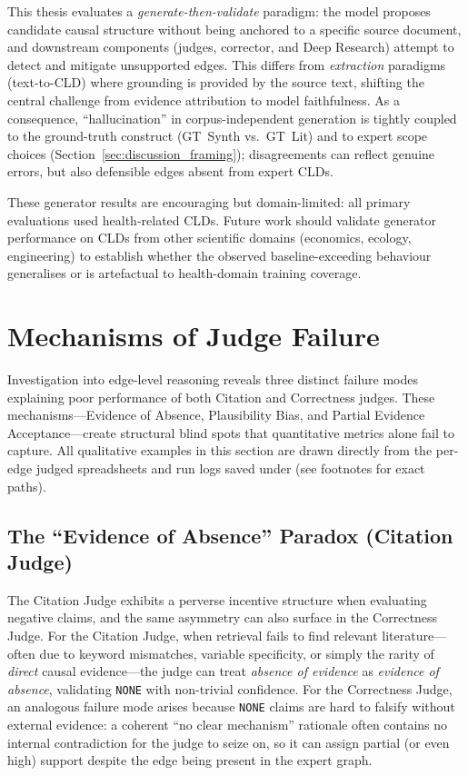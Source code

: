 This thesis evaluates a \emph{generate-then-validate} paradigm: the model proposes candidate causal structure without being anchored to a specific source document, and downstream components (judges, corrector, and Deep Research) attempt to detect and mitigate unsupported edges. This differs from \emph{extraction} paradigms (text-to-CLD) where grounding is provided by the source text, shifting the central challenge from evidence attribution to model faithfulness. As a consequence, ``hallucination'' in corpus-independent generation is tightly coupled to the ground-truth construct (GT~Synth vs.\ GT~Lit) and to expert scope choices (Section~\ref{sec:discussion_framing}); disagreements can reflect genuine errors, but also defensible edges absent from expert CLDs.

These generator results are encouraging but domain-limited: all primary evaluations used health-related CLDs. Future work should validate generator performance on CLDs from other scientific domains (economics, ecology, engineering) to establish whether the observed baseline-exceeding behaviour generalises or is artefactual to health-domain training coverage.

\section{Mechanisms of Judge Failure}
\label{sec:discussion_failure_mechanisms}

Investigation into edge-level reasoning reveals three distinct failure modes explaining poor performance of both Citation and Correctness judges. These mechanisms---Evidence of Absence, Plausibility Bias, and Partial Evidence Acceptance---create structural blind spots that quantitative metrics alone fail to capture.
All qualitative examples in this section are drawn directly from the per-edge judged spreadsheets and run logs saved under \texttt{} (see footnotes for exact paths).

\subsection{The ``Evidence of Absence'' Paradox (Citation Judge)}

The Citation Judge exhibits a perverse incentive structure when evaluating negative claims, and the same asymmetry can also surface in the Correctness Judge. For the Citation Judge, when retrieval fails to find relevant literature---often due to keyword mismatches, variable specificity, or simply the rarity of \textit{direct} causal evidence---the judge can treat \textit{absence of evidence} as \textit{evidence of absence}, validating \texttt{NONE} with non-trivial confidence. For the Correctness Judge, an analogous failure mode arises because \texttt{NONE} claims are hard to falsify without external evidence: a coherent ``no clear mechanism'' rationale often contains no internal contradiction for the judge to seize on, so it can assign partial (or even high) support despite the edge being present in the expert graph.

